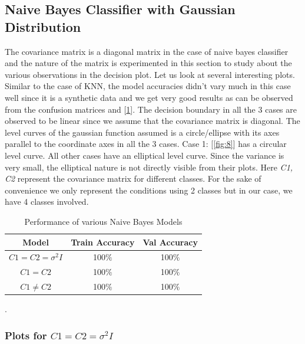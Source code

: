 \subsection{Naive Bayes Classifier with Gaussian Distribution}

The covariance matrix is a diagonal matrix in the case of naive bayes classifier and the nature of the matrix is experimented in this section to study about the various observations in the decision plot. Let us look at several interesting plots. \\

Similar to the case of KNN, the model accuracies didn't vary much in this case well since it is a synthetic data and we get very good results as can be observed from the confusion matrices and [\ref{table:2}]. The decision boundary in all the 3 cases are observed to be linear since we assume that the covariance matrix is diagonal. The level curves of the gaussian function assumed is a circle/ellipse with its axes parallel to the coordinate axes in all the 3 cases. Case 1: [\ref{fig:8}] has a circular level curve. All other cases have an elliptical level curve. Since the variance is very small, the elliptical nature is not directly visible from their plots. Here \textit{C1, C2} represent the covariance matrix for different classes. For the sake of convenience we only represent the conditions using 2 classes but in our case, we have 4 classes involved.

\hspace{5cm}
{
\begin{table}[!h]
\centering
\begin{tabular}{ |c|c|c| }
\hline
\rowcolor{lightgray} Model & Train Accuracy & Val Accuracy \\
\hline
$C1=C2=\sigma^2I$ & 100$\%$  & 100$\%$\\   
 \hline
$C1=C2$ & 100$\%$  & 100$\%$ \\ 
 \hline
$C1 \neq C2$ & 100$\%$  & 100$\%$\\ 
\hline
\end{tabular}
\caption{Performance of various Naive Bayes Models}.
\label{table:2}
\end{table}
}

\newpage
\subsubsection{Plots for $C1=C2=\sigma^2I$}

